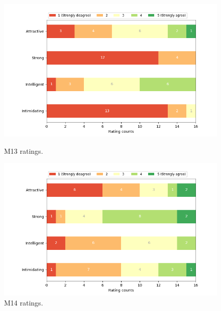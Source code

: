 \begin{figure}[H]
  \includegraphics[width=\linewidth]{Survey/MRatings/avatar_m13.png}
  \caption{M13 ratings.}
\endminipage\hfill
{}
  \includegraphics[width=\linewidth]{Survey/MRatings/avatar_m14.png}
  \caption{M14 ratings.}
\endminipage\hfill
\end{figure}
